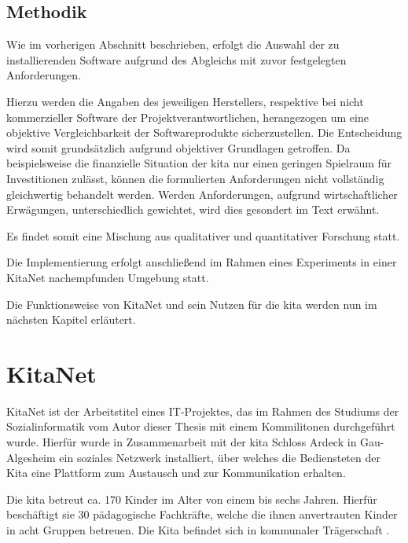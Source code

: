 \section{Methodik}

Wie im vorherigen Abschnitt beschrieben, erfolgt die Auswahl der zu installierenden Software aufgrund des Abgleichs mit zuvor festgelegten Anforderungen.

Hierzu werden die Angaben des jeweiligen Herstellers, respektive bei nicht kommerzieller Software der Projektverantwortlichen, herangezogen um eine objektive Vergleichbarkeit der Softwareprodukte sicherzustellen. Die Entscheidung wird somit grundsätzlich aufgrund objektiver Grundlagen getroffen.  Da beispielsweise die finanzielle Situation der \ac{kita} nur einen geringen Spielraum für Investitionen zulässt, können die formulierten Anforderungen nicht vollständig gleichwertig behandelt werden. Werden Anforderungen, \zb aufgrund wirtschaftlicher Erwägungen, unterschiedlich gewichtet, wird dies gesondert im Text erwähnt.

Es findet somit eine Mischung aus qualitativer und quantitativer Forschung statt.

Die Implementierung erfolgt anschließend im Rahmen eines Experiments in einer KitaNet nachempfunden Umgebung statt.

Die Funktionsweise von KitaNet und sein Nutzen für die \ac{kita} werden nun im nächsten Kapitel erläutert.

\chapter{KitaNet}


KitaNet ist der Arbeitstitel eines IT-Projektes, das im Rahmen des Studiums der Sozialinformatik vom Autor dieser Thesis mit einem Kommilitonen durchgeführt wurde. Hierfür wurde in Zusammenarbeit mit der \ac{kita} Schloss Ardeck in Gau-Algesheim ein soziales Netzwerk installiert, über welches die Bediensteten der Kita eine Plattform zum Austausch und zur Kommunikation erhalten. 

Die \ac{kita} betreut ca. 170 Kinder im Alter von einem bis sechs Jahren. Hierfür beschäftigt sie 30 pädagogische Fachkräfte, welche die ihnen anvertrauten Kinder in acht Gruppen betreuen. Die Kita befindet sich in kommunaler Trägerschaft \citep[vgl.][]{kitaweb}.

